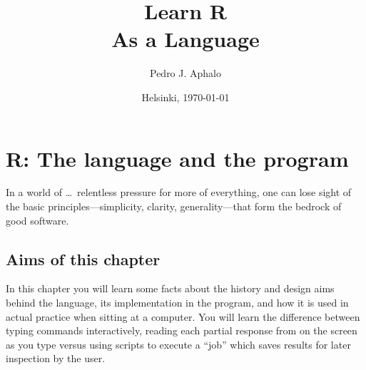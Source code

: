 \documentclass[krantz2]{krantz}\usepackage{knitr}
\begin{document}

\title{\Huge{\sffamily Learn R\\{\Large As a Language}}}

\author{Pedro J. Aphalo}

\date{Helsinki, \today}


















\frontmatter

\maketitle

\newpage

\setcounter{page}{7} %
\tableofcontents
%


\mainmatter






\chapter{R: The language and the program}\label{chap:R:introduction}

\begin{VF}
In a world of \ldots\ relentless pressure for more of everything, one can lose sight of the basic principles---simplicity, clarity, generality---that form the bedrock of good software.

\nocite{Kernighan1999}
\end{VF}


\section{Aims of this chapter}

In this chapter you will learn some facts about the history and design aims behind the \Rlang language, its implementation in the \Rpgrm program, and how it is used in actual practice when sitting at a computer. You will learn the difference between typing commands interactively, reading each partial response from \Rlang on the screen as you type versus using \Rlang scripts to execute a ``job'' which saves results for later inspection by the user.
\end{document}
